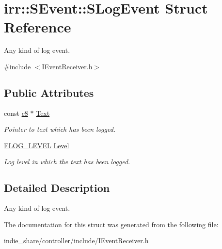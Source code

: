 \hypertarget{structirr_1_1SEvent_1_1SLogEvent}{}\section{irr\+:\+:S\+Event\+:\+:S\+Log\+Event Struct Reference}
\label{structirr_1_1SEvent_1_1SLogEvent}


Any kind of log event.  




{\ttfamily \#include $<$I\+Event\+Receiver.\+h$>$}

\subsection*{Public Attributes}
\begin{DoxyCompactItemize}
\item 
\mbox{\label{structirr_1_1SEvent_1_1SLogEvent_a50bdc3d9e7cc7b4780bba2b321b5117d}} 
const \hyperlink{namespaceirr_a9395eaea339bcb546b319e9c96bf7410}{c8} $\ast$ \hyperlink{structirr_1_1SEvent_1_1SLogEvent_a50bdc3d9e7cc7b4780bba2b321b5117d}{Text}
\begin{DoxyCompactList}\small\item\em Pointer to text which has been logged. \end{DoxyCompactList}\item 
\mbox{\label{structirr_1_1SEvent_1_1SLogEvent_aeb9088d42b7445ac43558e4fe5319db6}} 
\hyperlink{namespaceirr_aa2d1cac68606a25ed24cfffccfa30a92}{E\+L\+O\+G\+\_\+\+L\+E\+V\+EL} \hyperlink{structirr_1_1SEvent_1_1SLogEvent_aeb9088d42b7445ac43558e4fe5319db6}{Level}
\begin{DoxyCompactList}\small\item\em Log level in which the text has been logged. \end{DoxyCompactList}\end{DoxyCompactItemize}


\subsection{Detailed Description}
Any kind of log event. 

The documentation for this struct was generated from the following file\+:\begin{DoxyCompactItemize}
\item 
indie\+\_\+share/controller/include/I\+Event\+Receiver.\+h\end{DoxyCompactItemize}
